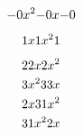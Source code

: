 \documentclass[10pt,a4paper]{article}
\newcommand{\trigsecgrad}[5]{%
	\ifcase #5%
	{#1 x^2}
	\or
	{#2 x}
	\or
	{#3}%
	\or
	{#1 x^2}%
	\or
	{#2 x}
	\or
	{#3}
	\fi%
\ifcase #5%
{#2x}
\or
{#1 x^2}
\or
{#2 x}
\or
{#3}
\or
{#3}
\or
{#1 x^2}
\fi
\ifcase #5%
{#3}
\or
{#3}
\or
{#1 x^2}
\or
{#2 x}
\or
{#1 x^2}
\or
{#2 x}
\fi
}
\begin{document}
\[\trigsecgrad{-0}{-0}{-0}{-0}{0}\]

\[\trigsecgrad{1}{1}{1}{1}{1}\]

\[\trigsecgrad{2}{2}{2}{2}{2}\]
\[\trigsecgrad{3}{3}{3}{3}{3}\]
\[\trigsecgrad{1}{2}{3}{4}{4}\]
\[\trigsecgrad{1}{2}{3}{4}{5}\]
\end{document}
